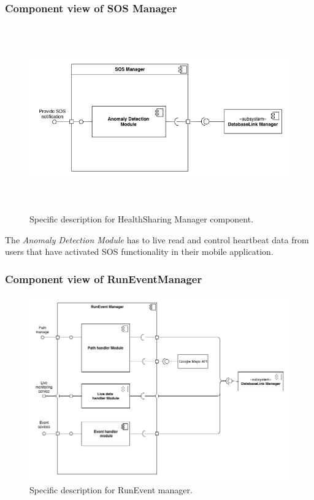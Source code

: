 \documentclass[DD.tex]{subfiles}
\begin{document}
\subsubsection{Component view of SOS Manager}
\begin{figure}[h!]
	\centering
	\includegraphics[height=8.00cm,keepaspectratio]{Figures/SOSManagerComponent}
	\caption{Specific description for HealthSharing Manager component.}
\end{figure}

The \textit{Anomaly Detection Module} has to live read and control heartbeat data from users that have activated SOS functionality in their mobile application.
\newpage



\subsubsection{Component view of RunEventManager}
\begin{figure}[h!]
	\centering
	\includegraphics[height=8.00cm,keepaspectratio]{Figures/RunEventManagerComponent}
	\caption{Specific description for RunEvent manager.}
\end{figure}
\end{document}
